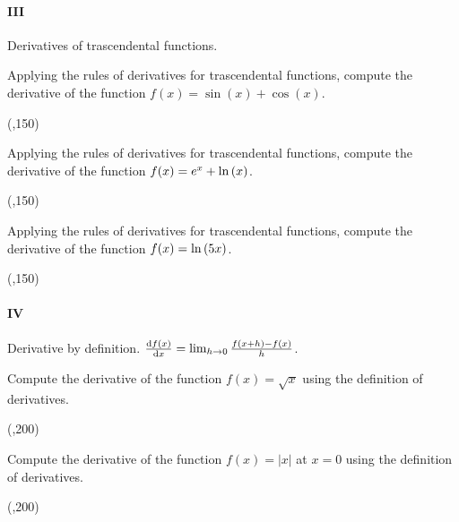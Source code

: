 \newpage

\paragraph{III} Derivatives of trascendental functions.

\begin{preguntas}

\pregunta[6] Applying the rules of derivatives for trascendental functions, compute the derivative of the function $f(x) = \sin(x) + \cos(x)$. 

\begin{center}
    \framebox(\textwidth,150){} 
\end{center}


\pregunta[6] Applying the rules of derivatives for trascendental functions, compute the derivative of the function $f(x) = e^x + \ln\qty(x)$.

\begin{center}
    \framebox(\textwidth,150){} 
\end{center}

\pregunta[8] Applying the rules of derivatives for trascendental functions, compute the derivative of the function $f(x) = \ln\qty(5x)$.

\begin{center}
    \framebox(\textwidth,150){} 
\end{center}



\end{preguntas}

\newpage

\paragraph{IV} Derivative by definition. \(\dv{f(x)}{x} = \lim_{h\to0}\frac{f(x+h) - f(x)}{h}\).

\begin{preguntas}

\pregunta[20] Compute the derivative of the function \(f(x) = \sqrt{x}\) using the definition of derivatives. 

\begin{center}
    \framebox(\textwidth,200){} 
\end{center}

\pregunta[20] Compute the derivative of the function \( f(x) = |x| \) at $x=0$ using the definition of derivatives.

\begin{center}
    \framebox(\textwidth,200){} 
\end{center}

\end{preguntas}

